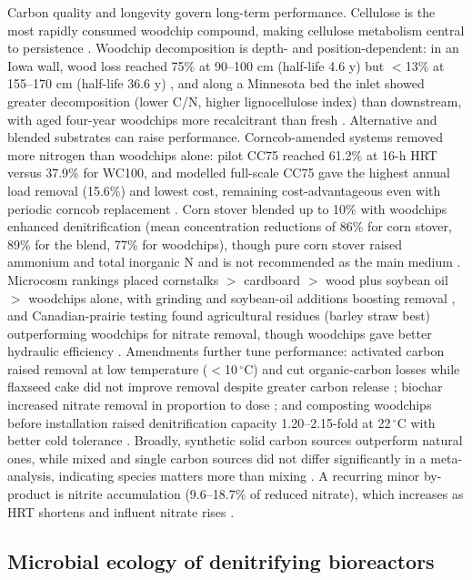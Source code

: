 \documentclass[11pt]{article}
\begin{document}
Carbon quality and longevity govern long-term performance. Cellulose is the most rapidly consumed woodchip compound, making cellulose metabolism central to persistence \parencite{Hartfiel2022}. Woodchip decomposition is depth- and position-dependent: in an Iowa wall, wood loss reached 75\% at 90--100 cm (half-life 4.6 y) but $<$13\% at 155--170 cm (half-life 36.6 y) \parencite{Moorman2010}, and along a Minnesota bed the inlet showed greater decomposition (lower C/N, higher lignocellulose index) than downstream, with aged four-year woodchips more recalcitrant than fresh \parencite{Ghane2018}. Alternative and blended substrates can raise performance. Corncob-amended systems removed more nitrogen than woodchips alone: pilot CC75 reached 61.2\% at 16-h HRT versus 37.9\% for WC100, and modelled full-scale CC75 gave the highest annual load removal (15.6\%) and lowest cost, remaining cost-advantageous even with periodic corncob replacement \parencite{Law2023}. Corn stover blended up to 10\% with woodchips enhanced denitrification (mean concentration reductions of 86\% for corn stover, 89\% for the blend, 77\% for woodchips), though pure corn stover raised ammonium and total inorganic N and is not recommended as the main medium \parencite{Oladeji2023}. Microcosm rankings placed cornstalks $>$ cardboard $>$ wood plus soybean oil $>$ woodchips alone, with grinding and soybean-oil additions boosting removal \parencite{Greenan2006}, and Canadian-prairie testing found agricultural residues (barley straw best) outperforming woodchips for nitrate removal, though woodchips gave better hydraulic efficiency \parencite{Kohn2023}. Amendments further tune performance: activated carbon raised removal at low temperature ($<$10\,$^{\circ}$C) and cut organic-carbon losses while flaxseed cake did not improve removal despite greater carbon release \parencite{Povilaitis2020}; biochar increased nitrate removal in proportion to dose \parencite{Ahmadvand2020}; and composting woodchips before installation raised denitrification capacity 1.20--2.15-fold at 22\,$^{\circ}$C with better cold tolerance \parencite{Kouanda2021}. Broadly, synthetic solid carbon sources outperform natural ones, while mixed and single carbon sources did not differ significantly in a meta-analysis, indicating species matters more than mixing \parencite{Zhang2021b}. A recurring minor by-product is nitrite accumulation (9.6--18.7\% of reduced nitrate), which increases as HRT shortens and influent nitrate rises \parencite{Hua2016,Kouanda2021}.

\subsection{Microbial ecology of denitrifying bioreactors}
\end{document}
